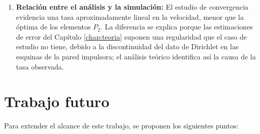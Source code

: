 \documentclass[12pt, letterpaper]{report}
\theoremstyle{definition}
\begin{document}
\begin{enumerate}
    \item \textbf{Relación entre el análisis y la simulación:} El estudio de convergencia evidencia una tasa aproximadamente lineal en la velocidad, menor que la óptima de los elementos $P_2$. La diferencia se explica porque las estimaciones de error del Capítulo \ref{chap:teoria} suponen una regularidad que el caso de estudio no tiene, debido a la discontinuidad del dato de Dirichlet en las esquinas de la pared impulsora; el análisis teórico identifica así la causa de la tasa observada.
\end{enumerate}

\section{Trabajo futuro}
\label{sec:trabajo_futuro}

Para extender el alcance de este trabajo, se proponen los siguientes puntos:
\end{document}
